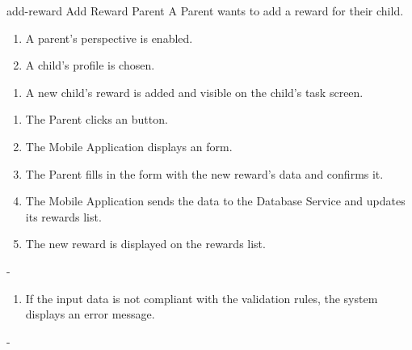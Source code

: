 {add-reward}
{Add Reward}
{Parent}
{A Parent wants to add a reward for their child.}
{\begin{enumerate} %
    \item A parent's perspective is enabled.
    \item A child's profile is chosen.
\end{enumerate}}
{\begin{enumerate} %
   \item A new child's reward is added and visible on the child's task screen.
\end{enumerate}}
{\begin{enumerate} %
   \item The Parent clicks an  button.
   \item The Mobile Application displays an  form.
   \item The Parent fills in the form with the new reward's data and confirms it.
   \item The Mobile Application sends the data to the Database Service and updates its rewards list.
   \item The new reward is displayed on the rewards list.
\end{enumerate}}
{-}%
{\begin{enumerate} %
[label=3.\alph*.]
    \item If the input data is not compliant with the validation rules, the system displays an error message.
\end{enumerate}}
{-} %


